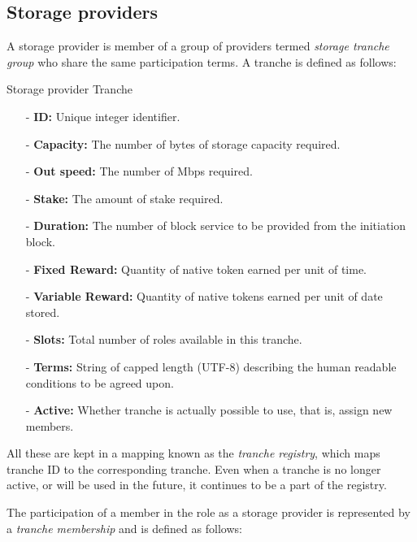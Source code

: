 \documentclass{article}
\newenvironment{concept_box}[1]
    {
    \begin{tcolorbox}
    {\large \textbf{#1} }
    }
    {
    \end{tcolorbox}
    }
\begin{document}
\subsection{Storage providers}

A storage provider is member of a group of providers termed \textit{storage tranche group} who share the same participation terms. A tranche is defined as follows: \\

\begin{concept_box}{Storage provider Tranche}
    \begin{itemize}
      \item[-] \textbf{ID:} Unique integer identifier.
      \item[-] \textbf{Capacity:} The number of bytes of storage capacity required.
      \item[-] \textbf{Out speed:} The number of Mbps required.
      \item[-] \textbf{Stake:} The amount of stake required.
      \item[-] \textbf{Duration:} The number of block service to be provided from the initiation block.
      \item[-] \textbf{Fixed Reward:} Quantity of native token earned per unit of time.
      \item[-] \textbf{Variable Reward:} Quantity of native tokens earned per unit of date stored.
      \item[-] \textbf{Slots:} Total number of roles available in this tranche.
      \item[-] \textbf{Terms:} String of capped length (UTF-8) describing the human readable conditions to be agreed upon.
      \item[-] \textbf{Active:} Whether tranche is actually possible to use, that is, assign new members.
    \end{itemize}
\end{concept_box}

All these are kept in a mapping known as the \textit{tranche registry}, which maps tranche ID to the corresponding tranche. Even when a tranche is no longer active, or will be used in the future, it continues to be a part of the registry.

The participation of a member in the role as a storage provider is represented by a \textit{tranche membership} and is defined as follows: \\
\end{document}
